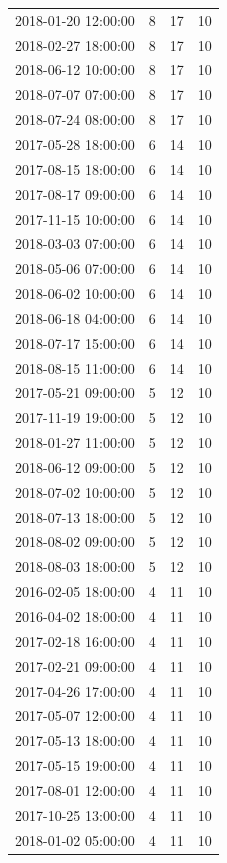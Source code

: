 \begin{tabular}{lrrr}
2018-01-20 12:00:00 & 8 & 17 & 10 \\
2018-02-27 18:00:00 & 8 & 17 & 10 \\
2018-06-12 10:00:00 & 8 & 17 & 10 \\
2018-07-07 07:00:00 & 8 & 17 & 10 \\
2018-07-24 08:00:00 & 8 & 17 & 10 \\
2017-05-28 18:00:00 & 6 & 14 & 10 \\
2017-08-15 18:00:00 & 6 & 14 & 10 \\
2017-08-17 09:00:00 & 6 & 14 & 10 \\
2017-11-15 10:00:00 & 6 & 14 & 10 \\
2018-03-03 07:00:00 & 6 & 14 & 10 \\
2018-05-06 07:00:00 & 6 & 14 & 10 \\
2018-06-02 10:00:00 & 6 & 14 & 10 \\
2018-06-18 04:00:00 & 6 & 14 & 10 \\
2018-07-17 15:00:00 & 6 & 14 & 10 \\
2018-08-15 11:00:00 & 6 & 14 & 10 \\
2017-05-21 09:00:00 & 5 & 12 & 10 \\
2017-11-19 19:00:00 & 5 & 12 & 10 \\
2018-01-27 11:00:00 & 5 & 12 & 10 \\
2018-06-12 09:00:00 & 5 & 12 & 10 \\
2018-07-02 10:00:00 & 5 & 12 & 10 \\
2018-07-13 18:00:00 & 5 & 12 & 10 \\
2018-08-02 09:00:00 & 5 & 12 & 10 \\
2018-08-03 18:00:00 & 5 & 12 & 10 \\
2016-02-05 18:00:00 & 4 & 11 & 10 \\
2016-04-02 18:00:00 & 4 & 11 & 10 \\
2017-02-18 16:00:00 & 4 & 11 & 10 \\
2017-02-21 09:00:00 & 4 & 11 & 10 \\
2017-04-26 17:00:00 & 4 & 11 & 10 \\
2017-05-07 12:00:00 & 4 & 11 & 10 \\
2017-05-13 18:00:00 & 4 & 11 & 10 \\
2017-05-15 19:00:00 & 4 & 11 & 10 \\
2017-08-01 12:00:00 & 4 & 11 & 10 \\
2017-10-25 13:00:00 & 4 & 11 & 10 \\
2018-01-02 05:00:00 & 4 & 11 & 10 \\

\end{tabular}
